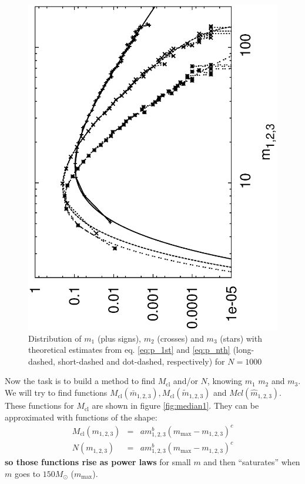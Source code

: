 \documentclass{aastex}
\newcommand{\MSun}{M_\odot}
\newcommand{\Mmax}{m_{\mathrm{max}}}
\newcommand{\Mcl}{M_{\mathrm{cl}}}
\begin{document}
\begin{figure}
  \begin{center}
   \includegraphics*[scale=0.50, angle=270]{./images/bw/alg1/hist_mass.eps}
  \end{center}
 \caption{Distribution of $m_1$ (plus signs), $m_2$ (crosses) and $m_3$ (stars) with theoretical estimates from eq. \ref{eq:p_1st} and \ref{eq:p_nth} (long-dashed, short-dashed and dot-dashed, respectively) for $N = 1000$ }  \label{fig:random_hist}
\end{figure}

Now the task is to build a method to find $\Mcl$ and/or $N$, knowing $m_1$ $m_2$ and $m_3$. We will try to find functions $\Mcl (\bar{m}_{1,2,3}), \Mcl( \tilde{m}_{1,2,3})$ and $Mcl ( \hat{m}_{1,2,3} )$. These functions for $\Mcl$ are shown in figure \ref{fig:median1}. They can be approximated with functions of the shape:
\begin{eqnarray} \label{eq:fits}
  \Mcl(m_{1,2,3}) &=& a m_{1,2,3}^b (\Mmax-m_{1,2,3})^c \\ \nonumber
  N(m_{1,2,3}) &=& a m_{1,2,3}^b (\Mmax-m_{1,2,3})^c
\end{eqnarray} 
\textbf{so those functions rise as power laws} for small $m$ and then ``saturates'' when $m$ goes to $150 \MSun$ ($\Mmax$).
\end{document}
